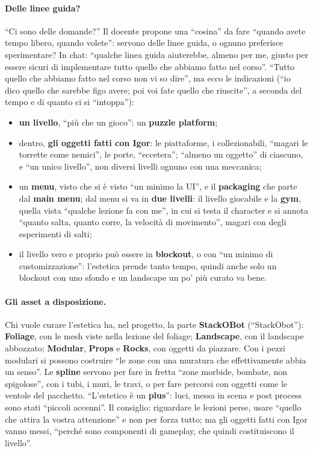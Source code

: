 \paragraph{Delle linee guida?} ``Ci sono delle domande?'' Il docente propone una ``cosina'' da
fare ``quando avete tempo libero, quando volete'': servono delle linee guida, o ognuno preferisce
sperimentare? In chat: ``qualche linea guida aiuterebbe, almeno per me, giusto per essere sicuri
di implementare tutto quello che abbiamo fatto nel corso''. ``Tutto quello che abbiamo fatto nel
corso non vi so dire'', ma ecco le indicazioni (``io dico quello che sarebbe figo avere; poi voi
fate quello che riuscite'', a seconda del tempo e di quanto ci si ``intoppa''):
\begin{itemize}
  \item \textbf{un livello}, ``più che un gioco'': un \textbf{puzzle platform};
  \item dentro, \textbf{gli oggetti fatti con Igor}: le piattaforme, i collezionabili, ``magari
        le torrette come nemici'', le porte, ``eccetera''; ``almeno un oggetto'' di ciascuno, e
        ``un unico livello'', non diversi livelli ognuno con una meccanica;
  \item un \textbf{menu}, visto che si è visto ``un minimo la UI'', e il \textbf{packaging} che
        parte dal \textbf{main menu}; dal menu si va in \textbf{due livelli}: il livello giocabile
        e la \textbf{gym}, quella vista ``qualche lezione fa con me'', in cui si testa il
        character e si annota ``quanto salta, quanto corre, la velocità di movimento'', magari con
        degli esperimenti di salti;
  \item il livello vero e proprio può essere in \textbf{blockout}, o con ``un minimo di
        customizzazione'': l'estetica prende tanto tempo, quindi anche solo un blockout con uno
        sfondo e un landscape un po' più curato va bene.
\end{itemize}

\paragraph{Gli asset a disposizione.} Chi vuole curare l'estetica ha, nel progetto, la parte
\textbf{StackOBot} (``StackObot''): \textbf{Foliage}, con le mesh viste nella lezione del
foliage; \textbf{Landscape}, con il landscape abbozzato; \textbf{Modular}, \textbf{Props} e
\textbf{Rocks}, con oggetti da piazzare. Con i pezzi modulari si possono costruire ``le zone con
una muratura che effettivamente abbia un senso''. Le \textbf{spline} servono per fare in fretta
``zone morbide, bombate, non spigolose'', con i tubi, i muri, le travi, o per fare percorsi con
oggetti come le ventole del pacchetto. ``L'estetico è un \textbf{plus}'': luci, messa in scena e
post process sono stati ``piccoli accenni''. Il consiglio: riguardare le lezioni perse, usare
``quello che attira la vostra attenzione'' e non per forza tutto; ma gli oggetti fatti con Igor
vanno messi, ``perché sono componenti di gameplay, che quindi costituiscono il livello''.

